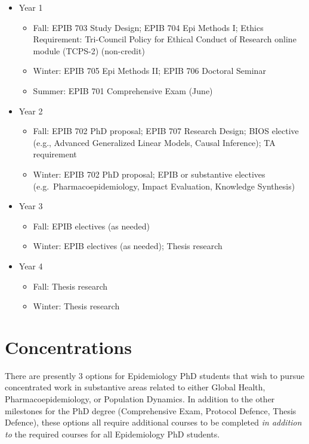 \documentclass[
  openany]{book}
\providecommand{\tightlist}{%
  \setlength{\itemsep}{0pt}\setlength{\parskip}{0pt}}
\begin{document}
\begin{itemize}
\tightlist
\item
  Year 1

  \begin{itemize}
  \tightlist
  \item
    Fall: EPIB 703 Study Design; EPIB 704 Epi Methods I; Ethics Requirement: Tri-Council Policy for Ethical Conduct of Research online module (TCPS-2) (non-credit)\\
  \item
    Winter: EPIB 705 Epi Methods II; EPIB 706 Doctoral Seminar
  \item
    Summer: EPIB 701 Comprehensive Exam (June)
  \end{itemize}
\item
  Year 2

  \begin{itemize}
  \tightlist
  \item
    Fall: EPIB 702 PhD proposal; EPIB 707 Research Design; BIOS elective (e.g., Advanced Generalized Linear Models, Causal Inference); TA requirement
  \item
    Winter: EPIB 702 PhD proposal; EPIB or substantive electives (e.g.~Pharmacoepidemiology, Impact Evaluation, Knowledge Synthesis)
  \end{itemize}
\item
  Year 3

  \begin{itemize}
  \tightlist
  \item
    Fall: EPIB electives (as needed)
  \item
    Winter: EPIB electives (as needed); Thesis research
  \end{itemize}
\item
  Year 4

  \begin{itemize}
  \tightlist
  \item
    Fall: Thesis research
  \item
    Winter: Thesis research
  \end{itemize}
\end{itemize}

\hypertarget{concentrations}{%
\chapter{Concentrations}\label{concentrations}}

There are presently 3 options for Epidemiology PhD students that wish to pursue concentrated work in substantive areas related to either Global Health, Pharmacoepidemiology, or Population Dynamics. In addition to the other milestones for the PhD degree (Comprehensive Exam, Protocol Defence, Thesis Defence), these options all require additional courses to be completed \emph{in addition to} the required courses for all Epidemiology PhD students.
\end{document}
